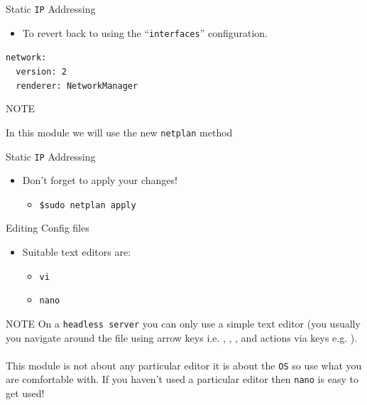 \documentclass{beamer}
\begin{document}
\begin{frame}{Static \texttt{IP} Addressing}
  \begin{itemize}
    \item To revert back to using the ``\texttt{interfaces}'' configuration.
  \end{itemize}
  \begin{center}
    \begin{minipage}{9cm}
      \begin{block}{}
        \texttt{network:\\
        ~~version: 2\\
        ~~renderer: NetworkManager\\}
      \end{block}
    \end{minipage}
  \end{center}
  \begin{block}{NOTE}
    \begin{center}
      In this module we will use the new \texttt{netplan} method      
    \end{center}
  \end{block}
\end{frame}

\begin{frame}{Static \texttt{IP} Addressing}
  \begin{itemize}
    \item Don't forget to apply your changes!
    \begin{itemize}
      \item \texttt{\$sudo netplan apply}
    \end{itemize}
  \end{itemize}
\end{frame}

\begin{frame}{Editing Config files}
  \begin{itemize}
    \item Suitable text editors are:
    \begin{itemize}
      \item \texttt{vi}
      \item \texttt{nano}
    \end{itemize}
  \end{itemize}
  \begin{block}{NOTE}
    On a \texttt{headless server} you can only use a simple text editor (you usually you navigate around the file using arrow keys i.e. \keys{\textuparrow}, \keys{\textdownarrow}, \keys{\textleftarrow}, \keys{\textrightarrow} and actions via  keys e.g. ).\\~\\
    This module is not about any particular editor it is about the \texttt{OS} so use what you are comfortable with. If you haven't used a particular editor then \texttt{nano} is easy to get used!
  \end{block}
\end{frame}
\end{document}
